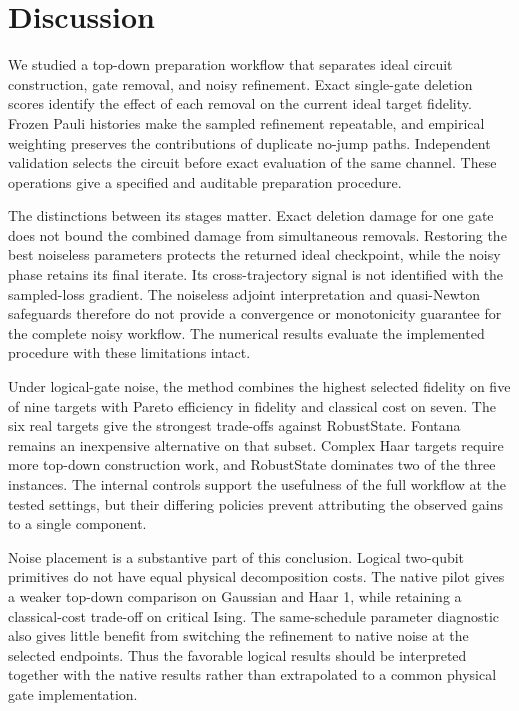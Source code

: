 \section{Discussion}
\label{sec:discussion}

We studied a top-down preparation workflow that separates ideal circuit
construction, gate removal, and noisy refinement. Exact single-gate
deletion scores identify the effect of each removal on the current ideal
target fidelity. Frozen Pauli histories make the sampled refinement
repeatable, and empirical weighting preserves the contributions of
duplicate no-jump paths. Independent validation selects the circuit
before exact evaluation of the same channel. These operations give a
specified and auditable preparation procedure.

The distinctions between its stages matter. Exact deletion damage for
one gate does not bound the combined damage from simultaneous removals.
Restoring the best noiseless parameters protects the returned ideal
checkpoint, while the noisy phase retains its final iterate. Its
cross-trajectory signal is not identified with the sampled-loss gradient.
The noiseless adjoint interpretation and quasi-Newton safeguards therefore
do not provide a convergence or monotonicity guarantee for the complete
noisy workflow. The numerical results evaluate the implemented procedure
with these limitations intact.

Under logical-gate noise, the method combines the highest selected fidelity
on five of nine targets with Pareto efficiency in fidelity and classical
cost on seven. The six real targets give the strongest trade-offs against
RobustState. Fontana remains an inexpensive alternative on that subset.
Complex Haar targets require more top-down construction work, and
RobustState dominates two of the three instances. The internal controls
support the usefulness of the full workflow at the tested settings, but
their differing policies prevent attributing the observed gains to a
single component.

Noise placement is a substantive part of this conclusion. Logical
two-qubit primitives do not have equal physical decomposition costs.
The native pilot gives a weaker top-down comparison on Gaussian and
Haar 1, while retaining a classical-cost trade-off on critical Ising.
The same-schedule parameter diagnostic also gives little benefit from
switching the refinement to native noise at the selected endpoints.
Thus the favorable logical results should be interpreted together with
the native results rather than extrapolated to a common physical gate
implementation.

